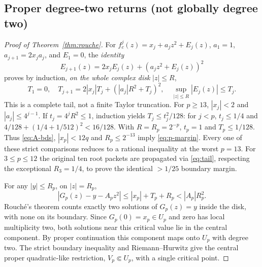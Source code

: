 \subsection{Proper degree-two returns (not globally degree two)}
\begin{proof}[Proof of Theorem~\ref{thm:rouche}]
For $f_c^j(z)=x_j+a_jz^2+E_j(z)$,
$a_1=1$, $a_{j+1}=2x_ja_j$, and
$E_1=0$, the \emph{identity}
\[
 E_{j+1}(z)=2x_jE_j(z)+(a_jz^2+E_j(z))^2
\]
proves by induction, \emph{on the whole complex disk} $|z|\le R$,
\begin{equation}\label{eq:tail}
 T_1=0,\quad
 T_{j+1}=2|x_j|T_j+(|a_j|R^2+T_j)^2,\quad
 \sup_{|z|\le R}|E_j(z)|\le T_j.
\end{equation}
This is a complete tail, not a finite Taylor truncation.
For $p\ge13$, $|x_j|<2$ and $|a_j|\le4^{j-1}$.
If $t_j=4^jR^2\le1$, induction yields
$T_j\le t_j^2/128$: for $j<p$,
$t_j\le1/4$ and
$4/128+(1/4+1/512)^2<16/128$.
With $R=R_p=2^{-p}$, $t_p=1$ and
$T_p\le1/128$.  Thus
\eqref{eq:A-bds}, $|x_p|<12q$ and
$R_p\le2^{-13}$ imply \eqref{eq:p-margin}.
Every one of these strict comparisons reduces
to a rational inequality at the worst $p=13$.
For $3\le p\le12$ the original ten root packets
are propagated via \eqref{eq:tail}, respecting
the exceptional $R_3=1/4$, to prove
the identical $>1/25$ boundary margin.

For any $|y|\le R_p$, on $|z|=R_p$,
\[
 |G_p(z)-y-A_pz^2|
 \le|x_p|+T_p+R_p<|A_p|R_p^2.
\]
Rouch\'e's theorem
\cite[Chapter 4, \S5.2, corollary to Theorem 18]{AhlforsComplex}
counts exactly two solutions of $G_p(z)=y$
inside the disk, with none on its boundary.
Since $G_p(0)=x_p\in U_p$ and zero has
local multiplicity two, both solutions
near this critical value lie in the central
component.  By proper continuation this
component maps onto $U_p$ with degree two.
The strict boundary inequality and
Riemann--Hurwitz
\cite[\S17.14]{Forster1981} give the
central proper quadratic-like restriction,
$V_p\Subset U_p$, with a single critical point.


\end{proof}
